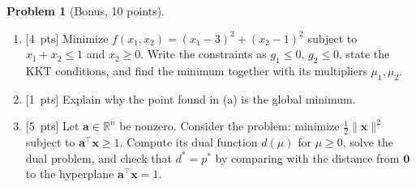 \documentclass[11pt]{article}
\theoremstyle{definition}
\newtheorem{problem}{Problem}
\newcommand{\norm}[1]{\lVert #1 \rVert}
\newcommand{\pts}[1]{\textup{[#1~pts]}}
\begin{document}
\begin{problem}[Bonus, 10 points]\label{pr:fin-kkt}
    \begin{enumerate}[label=(\alph*)]
        \item \pts{4} Minimize $f(x_1, x_2) = (x_1 - 3)^2 + (x_2 - 1)^2$ subject to $x_1 + x_2 \leq 1$ and $x_2 \geq 0$. Write the constraints as $g_1 \leq 0$, $g_2 \leq 0$, state the KKT conditions, and find the minimum together with its multipliers $\mu_1, \mu_2$.
        \item \pts{1} Explain why the point found in (a) is the global minimum.
        \item \pts{5} Let $\mathbf{a} \in \mathbb{R}^n$ be nonzero. Consider the problem: minimize $\frac{1}{2}\norm{\mathbf{x}}^2$ subject to $\mathbf{a}^\top\mathbf{x} \geq 1$. Compute its dual function $d(\mu)$ for $\mu \geq 0$, solve the dual problem, and check that $d^* = p^*$ by comparing with the distance from $\mathbf{0}$ to the hyperplane $\mathbf{a}^\top\mathbf{x} = 1$.
    \end{enumerate}
\end{problem}
\end{document}
